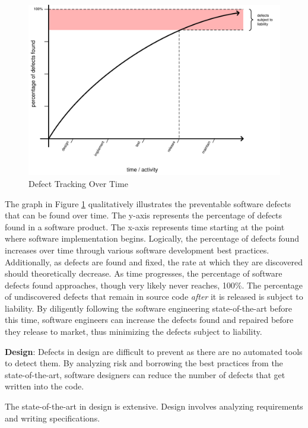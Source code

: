 \documentclass[12pt]{report}
\begin{document}
\begin{figure}[t] 
\begin{center} 
\includegraphics[scale=0.77]{figures/graph.pdf} 
\end{center} 
\caption{Defect Tracking Over Time} 
\label{fig:bugs} 
\end{figure} 

The graph in Figure \ref{fig:bugs} qualitatively illustrates the preventable software defects that can be found over time. The y-axis represents the percentage of defects found in a software product. The x-axis represents time starting at the point where software implementation begins. Logically, the percentage of defects found increases over time through various software development best practices. Additionally, as defects are found and fixed, the rate at which they are discovered should theoretically decrease. As time progresses, the percentage of software defects found approaches, though very likely never reaches, 100\%. The percentage of undiscovered defects that remain in source code \textit{after} it is released is subject to liability. By diligently following the software engineering state-of-the-art before this time, software engineers can increase the defects found and repaired before they release to market, thus minimizing the defects subject to liability.

\textbf{Design}: Defects in design are difficult to prevent as there are no automated tools to detect them. By analyzing risk and borrowing the best practices from the state-of-the-art, software designers can reduce the number of defects that get written into the code.

The state-of-the-art in design is extensive. Design involves analyzing requirements and writing specifications.
\end{document}
